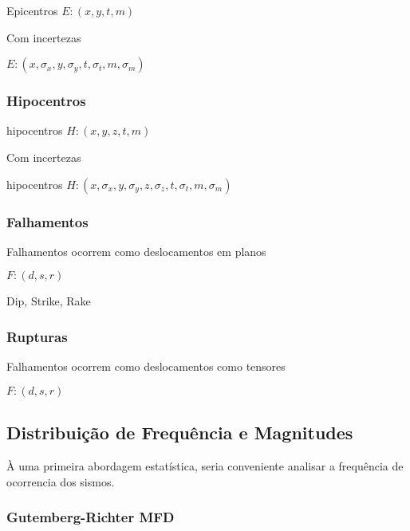 Epicentros $ E : {(x,y,t,m)}$

Com incertezas

$ E : {(x,\sigma_x,y,\sigma_y,t,\sigma_t,m,\sigma_m)}$


\subsubsection{Hipocentros}
\label{sec:fundamentos}

hipocentros $ H : {(x,y,z,t,m)}$

Com incertezas

hipocentros $ H : {(x,\sigma_x,y,\sigma_y,z,\sigma_z,t,\sigma_t,m,\sigma_m)}$


\subsubsection{Falhamentos}
\label{sec:fundamentos}

Falhamentos ocorrem como deslocamentos em planos 

$ F : {(d,s,r)}$

Dip, Strike, Rake



\subsubsection{Rupturas}
\label{sec:fundamentos}

Falhamentos ocorrem como deslocamentos como tensores 

$ F : {(d,s,r)}$




\subsection{Distribuição de Frequência e Magnitudes}
\label{sec:risco_sismico}

À uma primeira abordagem estatística, seria conveniente analisar a frequência de
ocorrencia dos sismos.

\subsubsection{Gutemberg-Richter MFD}
\label{sec:risco_sismico}

